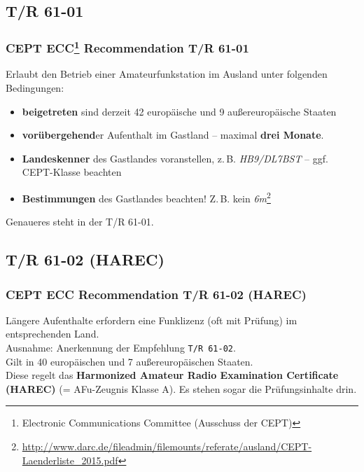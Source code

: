 \subsection{T/R 61-01}

\begin{frame}
  \frametitle{CEPT ECC\footnote{Electronic Communications Committee (Ausschuss
  der CEPT)} Recommendation T/R 61-01}

  Erlaubt den Betrieb einer Amateurfunkstation im Ausland unter folgenden
  Bedingungen:

  \begin{itemize}
    \item \textbf{beigetreten} sind derzeit 42 europäische und 9
      außereuropäische Staaten
    \item \textbf{vorübergehend}er Aufenthalt im Gastland -- maximal
      \textbf{drei Monate}.
    \item \textbf{Landeskenner} des Gastlandes voranstellen, z.\,B.
      \emph{HB9/DL7BST} -- ggf. CEPT-Klasse beachten
    \item \textbf{Bestimmungen} des Gastlandes beachten! Z.\,B. kein
      \emph{6m}\footnote{\scriptsize\ExternalLink\url{http://www.darc.de/fileadmin/filemounts/referate/ausland/CEPT-Laenderliste_2015.pdf}}
  \end{itemize}

  Genaueres steht in der T/R 61-01.

\end{frame}

\subsection{T/R 61-02 (HAREC)}

\begin{frame}
  \frametitle{CEPT ECC Recommendation T/R 61-02 (HAREC)}

  Längere Aufenthalte erfordern eine Funklizenz (oft mit Prüfung) im
  entsprechenden Land. \\[1em]

  Ausnahme: Anerkennung der Empfehlung \texttt{T/R 61-02}. \\[1em]

  Gilt in 40 europäischen und 7 außereuropäischen Staaten. \\[1em]

  Diese regelt das \textbf{Harmonized Amateur Radio Examination Certificate
  (HAREC)} (= AFu-Zeugnis Klasse A). Es stehen sogar die Prüfungsinhalte drin.

\end{frame}

